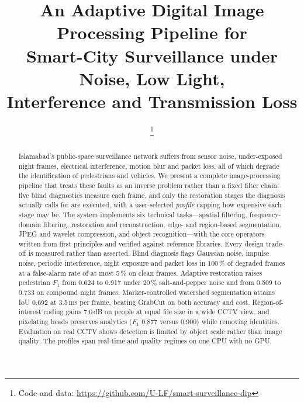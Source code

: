 \documentclass[conference,10pt]{IEEEtran}
\begin{document}
\title{An Adaptive Digital Image Processing Pipeline for\\
Smart-City Surveillance under Noise, Low Light,\\
Interference and Transmission Loss}

\author{%
\and
{}
\and
{}
\and
{}
\thanks{Code and data: \url{https://github.com/U-LF/smart-surveillance-dip}}}

\maketitle

\begin{abstract}
Islamabad's public-space surveillance network suffers from sensor noise,
under-exposed night frames, electrical interference, motion blur and packet
loss, all of which degrade the identification of pedestrians and vehicles. We
present a complete image-processing pipeline that treats these faults as an
inverse problem rather than a fixed filter chain: five blind diagnostics
measure each frame, and only the restoration stages the diagnosis actually
calls for are executed, with a user-selected \emph{profile} capping how
expensive each stage may be. The system implements six technical tasks---spatial filtering, frequency-domain filtering, restoration
and reconstruction, edge- and region-based segmentation, JPEG and wavelet
compression, and object recognition---with the core operators written from
first principles and verified against reference libraries. Every design
trade-off is measured rather than asserted. Blind diagnosis flags Gaussian
noise, impulse noise, periodic interference, night exposure and packet loss in
100\,\% of degraded frames at a false-alarm rate of at most 5\,\% on clean
frames. Adaptive restoration raises pedestrian $F_1$ from 0.624 to 0.917 under
20\,\% salt-and-pepper noise and from 0.509 to 0.733 on compound night frames.
Marker-controlled watershed segmentation attains IoU 0.692 at 3.5\,ms per
frame, beating GrabCut on both accuracy and cost. Region-of-interest coding
gains 7.0\,dB on people at equal file size in a wide CCTV view, and pixelating
heads preserves analytics ($F_1$ 0.877 versus 0.900) while removing identities.
Evaluation on real CCTV shows detection is limited by object scale rather than
image quality. The profiles span real-time and quality regimes on one CPU with
no GPU.
\end{abstract}
\end{document}
